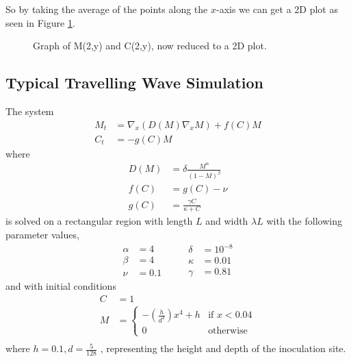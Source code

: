    So by taking the average of the points along the $x$-axis we can get a 2D plot as seen in Figure \ref{fig:true2D}. 
   
 
  \begin{figure}[h!bt]
    \begin{center}
      \caption{Graph of M(2,y) and C(2,y), now reduced to a 2D plot.}
      \label{fig:true2D}
    \end{center}
  \end{figure}




\subsection{Typical Travelling Wave Simulation}

The system
\begin{align}
    M_t &= \nabla_x \left( D(M) \nabla_x M \right) + f(C) M \\
    C_t &= - g(C) M 
\end{align}
where
\begin{align}
    D(M) &= \delta \frac{M^\alpha}{(1 - M)^\beta} \\
    f(C) &= g(C) - \nu  \\
    g(C) &= \frac{\gamma C}{\kappa +C}
\end{align}
is solved on a rectangular region with length $L$ and width $\lambda L$ with the following parameter values,
\begin{equation}
\begin{aligned}
    \alpha &= 4 \\
    \beta &= 4 \\
    \nu &= 0.1 
\end{aligned}
\qquad
\begin{aligned}
    \delta &= 10^{-8} \\
    \kappa &= 0.01\\
    \gamma &= 0.81
\end{aligned}
\end{equation}
and with initial conditions 
\begin{equation}
\begin{aligned}
    C &= 1 \\
    M &= \begin{cases} -(\frac{h}{d^4})x^4 + h & \text{if } x < 0.04 \\ 0 & \text{otherwise }\end{cases} \\
\end{aligned}
\end{equation}  
where $h = 0.1, d=\frac{5}{128}$ , representing the height and depth of the inoculation site.

